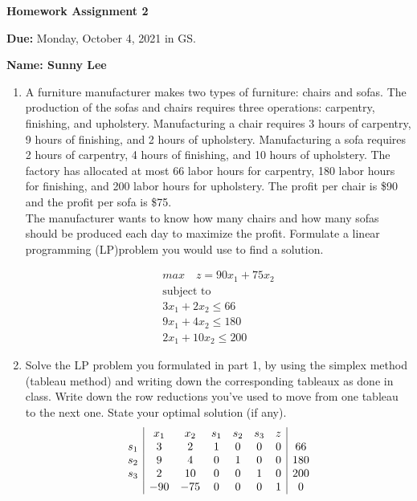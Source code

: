 \documentclass[12pt,english]{article}
\begin{document}
\textbf{Homework Assignment 2}\vspace{0.4cm}

\textbf{Due: }Monday, October 4, 2021 in GS.\vspace{0.6cm}

\textbf{Name: Sunny Lee\underline{\hspace{12cm}}\vspace{0.4cm}}
\begin{enumerate}
\item A furniture manufacturer makes two types of furniture: chairs and sofas. The production of the sofas and chairs requires three operations: carpentry, finishing, and upholstery. Manufacturing a chair requires 3 hours of carpentry, 9 hours of finishing, and 2 hours of upholstery. Manufacturing a sofa requires 2 hours of carpentry, 4 hours of finishing, and 10 hours of upholstery. The factory has allocated at most 66 labor hours for carpentry, 180 labor hours for finishing, and 200 labor hours for upholstery. The profit per chair is \$90 and the profit per sofa is \$75. \\

    The manufacturer wants to know how many chairs and how many sofas should be produced each day to maximize the profit. Formulate a linear programming (LP)problem you would use to find a solution.

\begin{gather*}
    max \quad z = 90x_1 + 75 x_2\\
    \text{subject to }\\
    3x_1 + 2x_2 \leq 66\\
    9x_1+4x_2 \leq 180\\
    2x_1 + 10x_2 \leq 200
\end{gather*}

\item Solve the LP problem you formulated in part 1, by using the simplex method (tableau method) and writing down the corresponding tableaux as done in class. Write down the row reductions you've used to move from one tableau to the next one. State your optimal solution (if any).
\[
\begin{array}{c | cccccc | c}
    & x_1 & x_2 & s_1 & s_2 & s_3 & z & \\
    s_1 & 3 &2 &1& 0& 0& 0& 66\\
    s_2 &9 &4 &0& 1 &0 &0& 180 \\
    s_3& 2& 10& 0& 0& 1& 0& 200\\
    &-90 &-75& 0& 0& 0& 1& 0 
\end{array}
\]


\end{enumerate}
\end{document}

